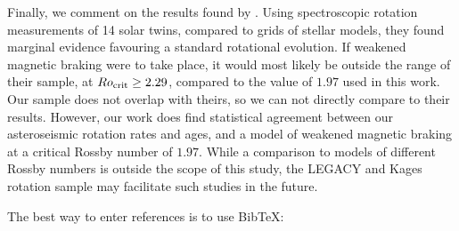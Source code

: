\documentclass[12pt]{article}
\begin{document}
Finally, we comment on the results found by \cite{lorenzo-oliveira+2019}. Using spectroscopic rotation measurements of 14 solar twins, compared to grids of stellar models, they found marginal evidence favouring a standard rotational evolution. If weakened magnetic braking were to take place, it would most likely be outside the range of their sample, at $Ro_{\rm {crit}} \geq 2.29$, compared to the value of $1.97$ used in this work. Our sample does not overlap with theirs, so we can not directly compare to their results. However, our work does find statistical agreement between our asteroseismic rotation rates and ages, and a model of weakened magnetic braking at a critical Rossby number of $1.97$. While a comparison to models of different Rossby numbers is outside the scope of this study, the LEGACY and Kages rotation sample may facilitate such studies in the future.


 The best way to enter references is to use BibTeX:

\end{document}
